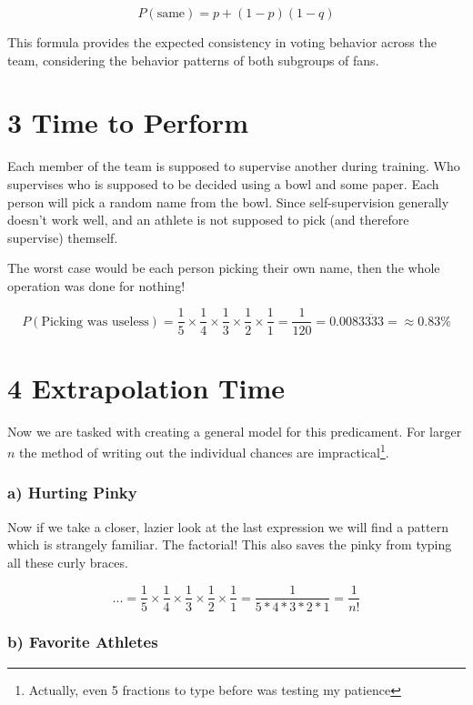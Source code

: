 \documentclass[
]{article}
\begin{document}
\[
P(\text{same}) = p + (1-p)(1-q)
\]

This formula provides the expected consistency in voting behavior across
the team, considering the behavior patterns of both subgroups of fans.

\section{3 Time to Perform}\label{time-to-perform}

Each member of the team is supposed to supervise another during
training. Who supervises who is supposed to be decided using a bowl and
some paper. Each person will pick a random name from the bowl. Since
self-supervision generally doesn't work well, and an athlete is not
supposed to pick (and therefore supervise) themself.

The worst case would be each person picking their own name, then the
whole operation was done for nothing!

\[
P(\text{Picking was useless}) = \frac{1}{5} \times \frac{1}{4} \times \frac{1}{3} \times \frac{1}{2} \times \frac{1}{1} = \frac{1}{120} = 0.008\overline{3333} = \approx 0.83\%
\]

\section{4 Extrapolation Time}\label{extrapolation-time}

Now we are tasked with creating a general model for this predicament.
For larger \(n\) the method of writing out the individual chances are
impractical\footnote{Actually, even 5 fractions to type before was testing my patience}.

\subsubsection{a) Hurting Pinky}\label{a-hurting-pinky}

Now if we take a closer, lazier look at the last expression we will find
a pattern which is strangely familiar. The factorial! This also saves
the pinky from typing all these curly braces.

\[
... = \frac{1}{5} \times \frac{1}{4} \times \frac{1}{3} \times \frac{1}{2} \times \frac{1}{1} = \frac{1}{5 * 4 * 3 * 2 * 1} = \frac{1}{n!}
\]

\subsubsection{b) Favorite Athletes}\label{b-favorite-athletes}
\end{document}
